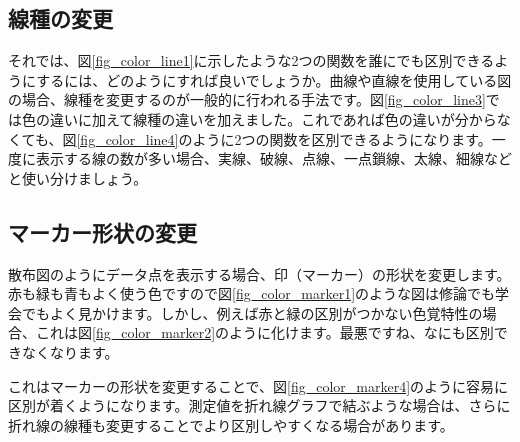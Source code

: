 \subsection{線種の変更}
それでは、図\ref{fig_color_line1}に示したような2つの関数を誰にでも区別できるようにするには、どのようにすれば良いでしょうか。曲線や直線を使用している図の場合、線種を変更するのが一般的に行われる手法です。図\ref{fig_color_line3}では色の違いに加えて線種の違いを加えました。これであれば色の違いが分からなくても、図\ref{fig_color_line4}のように2つの関数を区別できるようになります。一度に表示する線の数が多い場合、実線、破線、点線、一点鎖線、太線、細線などと使い分けましょう。


\subsection{マーカー形状の変更}

散布図のようにデータ点を表示する場合、印（マーカー）の形状を変更します。赤も緑も青もよく使う色ですので図\ref{fig_color_marker1}のような図は修論でも学会でもよく見かけます。しかし、例えば赤と緑の区別がつかない色覚特性の場合、これは図\ref{fig_color_marker2}のように化けます。最悪ですね、なにも区別できなくなります。

これはマーカーの形状を変更することで、図\ref{fig_color_marker4}のように容易に区別が着くようになります。測定値を折れ線グラフで結ぶような場合は、さらに折れ線の線種も変更することでより区別しやすくなる場合があります。


